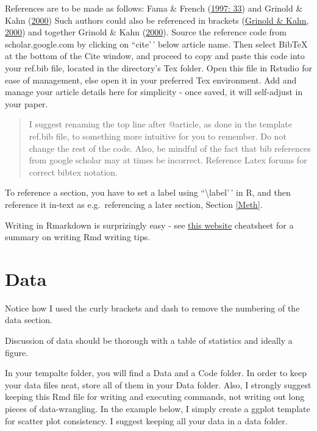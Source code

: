 \documentclass[12pt,preprint, authoryear]{elsarticle}
\numberwithin{equation}{section}
\numberwithin{figure}{section}
\numberwithin{table}{section}
\begin{document}
References are to be made as follows: Fama \& French
(\protect\hyperlink{ref-fama1997}{1997: 33}) and Grinold \& Kahn
(\protect\hyperlink{ref-grinold2000}{2000}) Such authors could also be
referenced in brackets (\protect\hyperlink{ref-grinold2000}{Grinold \&
Kahn, 2000}) and together Grinold \& Kahn
(\protect\hyperlink{ref-grinold2000}{2000}). Source the reference code
from scholar.google.com by clicking on ``cite'\,' below article name.
Then select BibTeX at the bottom of the Cite window, and proceed to copy
and paste this code into your ref.bib file, located in the directory's
Tex folder. Open this file in Rstudio for ease of management, else open
it in your preferred Tex environment. Add and manage your article
details here for simplicity - once saved, it will self-adjust in your
paper.

\begin{quote}
I suggest renaming the top line after @article, as done in the template
ref.bib file, to something more intuitive for you to remember. Do not
change the rest of the code. Also, be mindful of the fact that bib
references from google scholar may at times be incorrect. Reference
Latex forums for correct bibtex notation.
\end{quote}

To reference a section, you have to set a label using
``\textbackslash label'\,' in R, and then reference it in-text as
e.g.~referencing a later section, Section \ref{Meth}.

Writing in Rmarkdown is surprizingly easy - see
\href{https://www.rstudio.com/wp-content/uploads/2015/03/rmarkdown-reference.pdf}{this
website} cheatsheet for a summary on writing Rmd writing tips.

\hypertarget{data}{%
\section*{Data}\label{data}}

Notice how I used the curly brackets and dash to remove the numbering of
the data section.

Discussion of data should be thorough with a table of statistics and
ideally a figure.

In your tempalte folder, you will find a Data and a Code folder. In
order to keep your data files neat, store all of them in your Data
folder. Also, I strongly suggest keeping this Rmd file for writing and
executing commands, not writing out long pieces of data-wrangling. In
the example below, I simply create a ggplot template for scatter plot
consistency. I suggest keeping all your data in a data folder.
\end{document}
